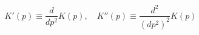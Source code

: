 \begin{equation}
K'(p) \equiv \frac{d}{dp^2} K(p),\quad K'' (p) \equiv \frac{d^2}{(d
p^2)^2} K(p)
\end{equation}

